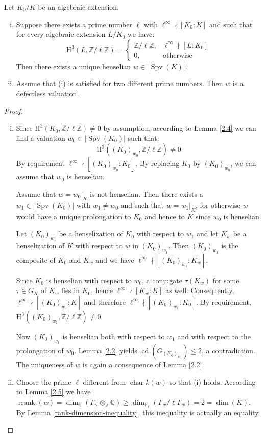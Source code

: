 \begin{proposition}\label{2.6}
Let $K_0/K$ be an algebraic extension.
\begin{enumerate}[(i)]
\item Suppose there exists a prime number $\ell$ with $\ell^\infty\nmid[K_0:K]$ and such that for every algebraic extension $L/K_0$ we have: 
\[ \mathrm{H}^3(L,\mathbb{Z}/\ell\mathbb{Z}) = \begin{cases}
\mathbb{Z}/\ell\mathbb{Z}, & \ell^\infty\nmid [L:K_0]\\
0, & \text{otherwise}
\end{cases} \]
Then there exists a unique henselian $w\in|\operatorname{Spv}(K)|$.
\item Assume that (i) is satisfied for two different prime numbers. Then $w$ is a defectless valuation.
\end{enumerate}
\end{proposition}

\begin{proof}
\begin{enumerate}[(i)]
\item Since $\mathrm{H}^3(K_0, \mathbb{Z}/\ell\mathbb{Z})\neq 0$ by assumption, according to Lemma \ref{2.4} we can find a valuation $w_0\in|\operatorname{Spv}(K_0)|$ such that:
\[ \mathrm{H}^3((K_0)_{w_0}, \mathbb{Z}/\ell\mathbb{Z}) \neq 0 \]
By requirement $\ell^\infty \nmid [(K_0)_{w_0} : K_0]$. By replacing $K_0$ by $(K_0)_{w_0}$, we can assume that $w_0$ is henselian.

Assume that $w = w_0|_K$ is not henselian. Then there exists a $w_1\in|\operatorname{Spv}(K_0)|$ with $w_1\neq w_0$ and such that $w = w_1|_K$, for otherwise $w$ would have a unique prolongation to $K_0$ and hence to $\overline{K}$ since $w_0$ is henselian.

Let $(K_0)_{w_1}$ be a henselization of $K_0$ with respect to $w_1$ and let $K_w$ be a henselization of $K$ with respect to $w$ in $(K_0)_{w_1}$. Then $(K_0)_{w_1}$ is the composite of $K_0$ and $K_w$ and we have $\ell^\infty\nmid [(K_0)_{w_1} : K_w]$.

Since $K_0$ is henselian with respect to $w_0$, a conjugate $\tau(K_w)$ for some $\tau\in G_K$ of $K_w$ lies in $K_0$, hence $\ell^\infty\nmid [K_w : K]$ as well. Consequently, $\ell^\infty \nmid [(K_0)_{w_1} : K]$ and therefore $\ell^\infty \nmid [(K_0)_{w_1} : K_0]$. By requirement, $\mathrm{H}^3((K_0)_{w_1}, \mathbb{Z}/\ell\mathbb{Z}) \neq 0$.

Now $(K_0)_{w_1}$ is henselian both with respect to $w_1$ and with respect to the prolongation of $w_0$. Lemma \ref{2.2} yields $\operatorname{cd}(G_{(K_0)_{w_1}})\leq 2$, a contradiction. The uniqueness of $w$ is again a consequence of Lemma \ref{2.2}.
\item Choose the prime $\ell$ different from $\operatorname{char} k(w)$ so that (i) holds. According to Lemma \ref{2.5} we have $\operatorname{rrank}(w)=\dim_\mathbb{Q}(\Gamma_w\otimes_\mathbb{Z}\mathbb{Q} )\geq \dim_{\mathbb{F}_\ell}(\Gamma_w /\ell\Gamma_w) = 2 = \dim(K)$. By Lemma \ref{rank-dimension-inequality}, this inequality is actually an equality.
\end{enumerate}
\end{proof}


